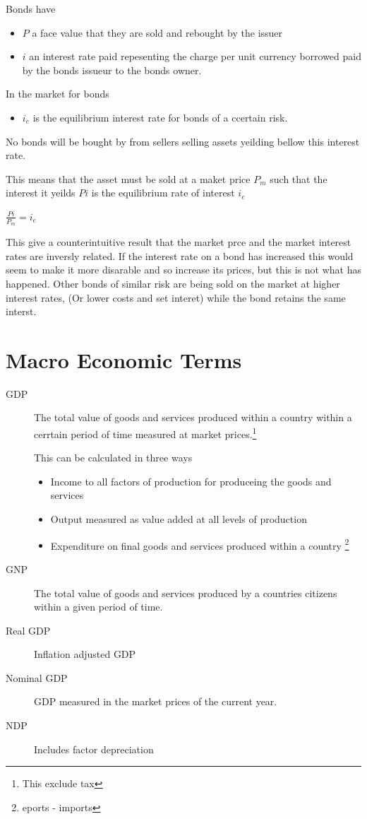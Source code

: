 \documentclass{tufte-book}
\providecommand{\tightlist}{%
  \setlength{\itemsep}{0pt}\setlength{\parskip}{0pt}}
\begin{document}
Bonds have

\begin{itemize}
\tightlist
\item
  \(P\) a face value that they are sold and rebought by the issuer
\item
  \(i\) an interest rate paid repesenting the charge per unit currency
  borrowed paid by the bonds issueur to the bonds owner.
\end{itemize}

In the market for bonds

\begin{itemize}
\tightlist
\item
  \(i_e\) is the equilibrium interest rate for bonds of a ccertain risk.
\end{itemize}

No bonds will be bought by from sellers selling assets yeilding bellow
this interest rate.

This means that the asset must be sold at a maket price \(P_m\) such
that the interest it yeilds \(Pi\) is the equilibrium rate of interest
\(i_e\)

\(\frac{Pi}{P_m} = i_e\)

This give a counterintuitive result that the market prce and the market
interest rates are inversly related. If the interest rate on a bond has
increased this would seem to make it more disarable and so increase its
prices, but this is not what has happened. Other bonds of similar risk
are being sold on the market at higher interest rates, (Or lower costs
and set interet) while the bond retains the same interst.\hypertarget{macro-economic-terms}{%
\section{Macro Economic Terms}\label{macro-economic-terms}}

\begin{description}
\item[GDP]
The total value of goods and services produced within a country within a
cerrtain period of time measured at market prices.\footnote{This exclude
  tax}

This can be calculated in three ways

\begin{itemize}
\tightlist
\item
  Income to all factors of production for produceing the goods and
  services
\item
  Output measured as value added at all levels of production
\item
  Expenditure on final goods and services produced within a country
  \footnote{eports - imports}
\end{itemize}
\item[GNP]
The total value of goods and services produced by a countries citizens
within a given period of time.
\item[Real GDP]
Inflation adjusted GDP
\item[Nominal GDP]
GDP measured in the market prices of the current year.
\item[NDP]
Includes factor depreciation
\end{description}
\end{document}

